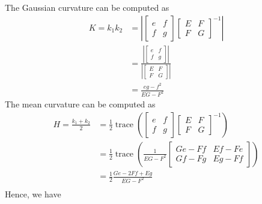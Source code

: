 \documentclass[a4paper]{report}
\DeclareMathOperator{\trace}{trace}
\begin{document}
The Gaussian curvature can be computed as
\begin{align}
	K = k_1 k_2 &= \left\lvert \left[\begin{array}{cc}
	e & f \\ 
	f & g
	\end{array} \right] \left[\begin{array}{cc}
	E & F \\ 
	F & G
	\end{array} \right]^{-1} \right\rvert\\
	&= \frac{\left\lvert \left[\begin{array}{cc}
		e & f \\ 
		f & g
		\end{array} \right] \right\rvert}{\left\lvert \left[\begin{array}{cc}
		E & F \\ 
		F & G
		\end{array} \right] \right\rvert}\\
	&= \frac{eg - f^2}{EG - F^2}
\end{align}
The mean curvature can be computed as
\begin{align}
	H = \frac{k_1 + k_2}{2} &= \frac{1}{2}\trace\left( \left[\begin{array}{cc}
	e & f \\ 
	f & g
	\end{array} \right] \left[\begin{array}{cc}
	E & F \\ 
	F & G
	\end{array} \right]^{-1}\right)\\
	&= \frac{1}{2} \trace\left( \frac{1}{EG - F^2} \left[\begin{array}{cc}
	Ge - Ff & Ef - Fe \\ 
	Gf - Fg & Eg - Ff
	\end{array} \right] \right)\\
	&= \frac{1}{2} \frac{Ge - 2Ff + Eg}{EG - F^2}\\
\end{align}
Hence, we have
\end{document}
